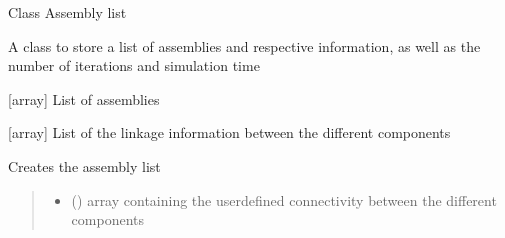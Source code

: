 \documentclass[letterpaper,10pt,english]{sphinxmanual}
\begin{document}
\begin{fulllineitems}
\label{\detokenize{modules:assembly.Assembly_list}}
\pysigstartsignatures
{}
\pysigstopsignatures
\sphinxAtStartPar
Class Assembly list

\sphinxAtStartPar
A class to store a list of assemblies and respective information, as well as the number of iterations and simulation time

\begin{fulllineitems}
\label{\detokenize{modules:assembly.Assembly_list.assembly}}
\pysigstartsignatures
{}
\pysigstopsignatures
\sphinxAtStartPar
{[}array{]} List of assemblies

\end{fulllineitems}


\begin{fulllineitems}
\label{\detokenize{modules:assembly.Assembly_list.connectivity}}
\pysigstartsignatures
{}
\pysigstopsignatures
\sphinxAtStartPar
{[}array{]} List of the linkage information between the different components

\end{fulllineitems}


\begin{fulllineitems}
\label{\detokenize{modules:assembly.Assembly_list.create_assembly}}
\pysigstartsignatures
{}
\pysigstopsignatures
\sphinxAtStartPar
Creates the assembly list
\begin{quote}\begin{description}
\begin{itemize}
\item {} 
\sphinxAtStartPar
{} () \textendash{} array containing the user\sphinxhyphen{}defined connectivity between the different components


\end{itemize}
\end{description}
\end{quote}
\end{fulllineitems}
\end{fulllineitems}
\end{document}
